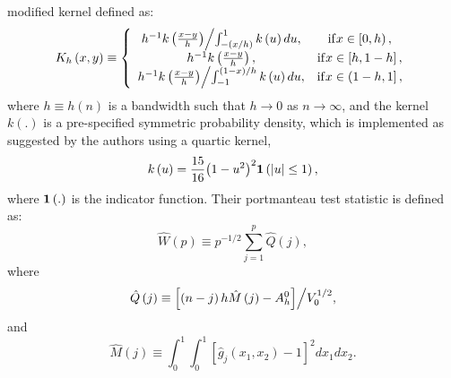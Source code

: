 modified kernel defined as:
\begin{equation}\label{eq:HL2}
{K_h}\left( {x,y} \right) \equiv \left\{ {\begin{array}{*{20}{c}}
{{{{h^{ - 1}}k\left( {\frac{{x - y}}{h}} \right)} \mathord{\left/
 {\vphantom {{{h^{ - 1}}k\left( {\frac{{x - y}}{h}} \right)} {\int_{ - \left( {x/h} \right)}^1 {k\left( u \right)du} ,}}} \right.
 \kern-\nulldelimiterspace} {\int_{ - \left( {x/h} \right)}^1 {k\left( u \right)du} ,}}}&{{\rm{if }}x \in \left[ {0,h} \right),}\\
{{h^{ - 1}}k\left( {\frac{{x - y}}{h}} \right),}&{{\rm{if }}x \in \left[ {h,1 - h} \right],}\\
{{{{h^{ - 1}}k\left( {\frac{{x - y}}{h}} \right)} \mathord{\left/
 {\vphantom {{{h^{ - 1}}k\left( {\frac{{x - y}}{h}} \right)} {\int_{ - 1}^{\left( {1 - x} \right)/h} {k\left( u \right)du} ,}}} \right.
 \kern-\nulldelimiterspace} {\int_{ - 1}^{\left( {1 - x} \right)/h} {k\left( u \right)du} ,}}}&{{\rm{if }}x \in \left( {1 - h,1} \right],}
\end{array}} \right.
\end{equation}
where $h\equiv h\left(n \right)$ is a bandwidth such that $h\rightarrow 0$ as $n\rightarrow \infty$, and the kernel $k(.)$ is a pre-specified symmetric probability density, which is implemented as suggested by the authors using a quartic kernel,
\begin{equation}\label{eq:quartic}
k\left( u \right) = \frac{{15}}{{16}}{\left( {1 - {u^2}} \right)^2}{\bf{1}}\left( {\left| u \right| \le 1} \right),
\end{equation}
where $\bf{1}\left(.\right)$ is the indicator function. Their portmanteau test statistic is defined as:
\begin{equation}\label{eq:HL3}
\hat W\left( p \right) \equiv {p^{ - 1/2}}\sum\limits_{j = 1}^p {\hat Q\left( j \right)},
\end{equation}
where
\begin{equation}\label{eq:HL4}
\hat Q\left( j \right) \equiv {{\left[ {\left( {n - j} \right)h\hat M\left( j \right) - A_h^0} \right]} \mathord{\left/
 {\vphantom {{\left[ {\left( {n - j} \right)h\hat M\left( j \right) - A_h^0} \right]} {V_0^{1/2}}}} \right.
 \kern-\nulldelimiterspace} {V_0^{1/2}}},
\end{equation}
and
\begin{equation}\label{eq:HL5}
\hat M\left( j \right) \equiv \int_0^1 {\int_0^1 {{{\left[ {{{\hat g}_j}\left( {{x_1},{x_2}} \right) - 1} \right]}^2}d{x_1}d{x_2}} }.
\end{equation}
